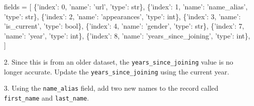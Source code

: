 \documentclass[11pt]{article}
\newenvironment{Shaded}{}{}
\newcommand{\DecValTok}[1]{\textcolor[rgb]{0.25,0.63,0.44}{{#1}}}
\newcommand{\StringTok}[1]{\textcolor[rgb]{0.25,0.44,0.63}{{#1}}}
\newcommand{\NormalTok}[1]{{#1}}
\newcommand{\OperatorTok}[1]{\textcolor[rgb]{0.40,0.40,0.40}{{#1}}}
\newcommand{\BuiltInTok}[1]{{#1}}
\begin{document}
\begin{Shaded}
\begin{Highlighting}[]
\NormalTok{fields }\OperatorTok{=}\NormalTok{ [}
\NormalTok{    \{}\StringTok{'index'}\NormalTok{: }\DecValTok{0}\NormalTok{, }\StringTok{'name'}\NormalTok{: }\StringTok{'url'}\NormalTok{, }\StringTok{'type'}\NormalTok{: }\BuiltInTok{str}\NormalTok{\}, }
\NormalTok{    \{}\StringTok{'index'}\NormalTok{: }\DecValTok{1}\NormalTok{, }\StringTok{'name'}\NormalTok{: }\StringTok{'name_alias'}\NormalTok{, }\StringTok{'type'}\NormalTok{: }\BuiltInTok{str}\NormalTok{\}, }
\NormalTok{    \{}\StringTok{'index'}\NormalTok{: }\DecValTok{2}\NormalTok{, }\StringTok{'name'}\NormalTok{: }\StringTok{'appearances'}\NormalTok{, }\StringTok{'type'}\NormalTok{: }\BuiltInTok{int}\NormalTok{\}, }
\NormalTok{    \{}\StringTok{'index'}\NormalTok{: }\DecValTok{3}\NormalTok{, }\StringTok{'name'}\NormalTok{: }\StringTok{'is_current'}\NormalTok{, }\StringTok{'type'}\NormalTok{: }\BuiltInTok{bool}\NormalTok{\}, }
\NormalTok{    \{}\StringTok{'index'}\NormalTok{: }\DecValTok{4}\NormalTok{, }\StringTok{'name'}\NormalTok{: }\StringTok{'gender'}\NormalTok{, }\StringTok{'type'}\NormalTok{: }\BuiltInTok{str}\NormalTok{\}, }
\NormalTok{    \{}\StringTok{'index'}\NormalTok{: }\DecValTok{7}\NormalTok{, }\StringTok{'name'}\NormalTok{: }\StringTok{'year'}\NormalTok{, }\StringTok{'type'}\NormalTok{: }\BuiltInTok{int}\NormalTok{\}, }
\NormalTok{    \{}\StringTok{'index'}\NormalTok{: }\DecValTok{8}\NormalTok{, }\StringTok{'name'}\NormalTok{: }\StringTok{'years_since_joining'}\NormalTok{, }\StringTok{'type'}\NormalTok{: }\BuiltInTok{int}\NormalTok{\}, }
\NormalTok{]}
\end{Highlighting}
\end{Shaded}

2. Since this is from an older dataset, the
\texttt{years\_since\_joining} value is no longer accurate. Update the
\texttt{years\_since\_joining} using the current year.

3. Using the \texttt{name\_alias} field, add two new names to the record
called \texttt{first\_name} and \texttt{last\_name}.
\end{document}
